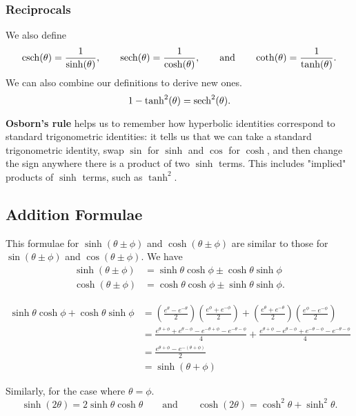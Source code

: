 \documentclass[10pt, a4paper]{article}
\begin{document}
\subsubsection{Reciprocals}
We also define
\[
\operatorname{csch} (\theta) = \frac{1}{\sinh (\theta)},\qquad\operatorname{sech} (\theta) = \frac{1}{\cosh (\theta)},\qquad\text{and}\qquad\coth (\theta) = \frac{1}{\tanh (\theta)}.
\]
We can also combine our definitions to derive new ones.
\[
1 - \tanh ^ 2 (\theta) = \operatorname{sech} ^ 2 (\theta).
\]

\textbf{Osborn's rule} helps us to remember how hyperbolic identities correspond to standard trigonometric identities: it tells us that we can take a standard trigonometric identity, swap $\sin$ for $\sinh$ and $\cos$ for $\cosh$, and then change the sign anywhere there is a product of two $\sinh$ terms. This includes "implied" products of $\sinh$ terms, such as $\tanh ^ 2$.

\subsection{Addition Formulae}
This formulae for $\sinh (\theta \pm \phi)$ and $\cosh (\theta \pm \phi)$ are similar to those for $\sin (\theta \pm \phi)$ and $\cos (\theta \pm \phi)$. We have
\begin{align*}
    \sinh (\theta \pm \phi) &= \sinh \theta \cosh \phi \pm \cosh \theta \sinh \phi \\
    \cosh (\theta \pm \phi) &= \cosh \theta \cosh \phi \pm \sinh \theta \sinh \phi.
\end{align*}

\begin{align*}
    \sinh \theta \cosh \phi + \cosh \theta \sinh \phi &= \left(\frac{e ^ \theta - e ^ {-\theta}}{2}\right)\left(\frac{e ^ \phi + e ^ {-\phi}}{2}\right) + \left(\frac{e ^ \theta + e ^ {-\theta}}{2}\right)\left(\frac{e ^ \phi - e ^ {-\phi}}{2}\right) \\
    &= \frac{e ^ {\theta + \phi} + e ^ {\theta - \phi} - e ^ {-\theta + \phi} - e ^ {-\theta -\phi}}{4} + \frac{e ^ {\theta + \phi} - e ^ {\theta - \phi} + e ^ {-\theta - \phi} - e ^ {-\theta -\phi}}{4} \\
    &= \frac{e ^ {\theta + \phi} - e ^ {-(\theta + \phi)}}{2} \\
    &= \sinh (\theta + \phi)
\end{align*}

Similarly, for the case where $\theta = \phi$.
\[
\sinh (2\theta) = 2\sinh\theta\cosh\theta\qquad\text{and}\qquad\cosh (2\theta) = \cosh ^ 2 \theta + \sinh ^ 2 \theta. 
\]
\end{document}
